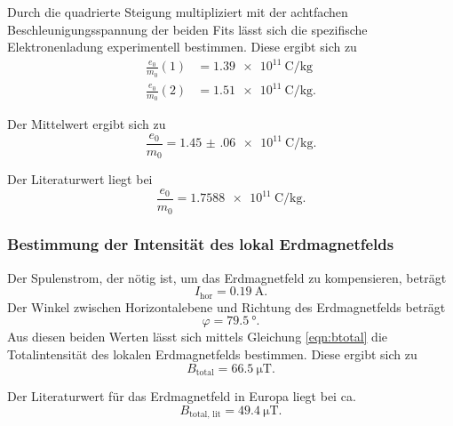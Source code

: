 \noindent Durch die quadrierte Steigung multipliziert mit der achtfachen Beschleunigungsspannung der beiden Fits
lässt sich die spezifische Elektronenladung experimentell bestimmen.
Diese ergibt sich zu
\begin{align*}
    \frac{e_0}{m_0}(1) &= \SI{1.39e11}{\coulomb\per\kilogram}\\
    \frac{e_0}{m_0}(2) &= \SI{1.51e11}{\coulomb\per\kilogram}.
\end{align*}

\noindent Der Mittelwert ergibt sich zu 
\begin{equation*}
    \frac{e_0}{m_0} = \SI{1.45(06)e11}{\coulomb\per\kilo\gram}.
\end{equation*}

\noindent Der Literaturwert liegt bei 
\begin{equation*}
    \frac{e_0}{m_0} = \SI{1.7588e11}{\coulomb\per\kilo\gram}.
\end{equation*}

\subsubsection{Bestimmung der Intensität des lokal Erdmagnetfelds}
Der Spulenstrom, der nötig ist, um das Erdmagnetfeld zu
kompensieren, beträgt
\begin{equation*}
    I_\text{hor} = \SI{0.19}{\ampere}.
\end{equation*}
Der Winkel zwischen Horizontalebene und Richtung des Erdmagnetfelds
beträgt
\begin{equation*}
    \varphi = \SI{79.5}{\degree}.
\end{equation*}
Aus diesen beiden Werten lässt sich mittels Gleichung \eqref{eqn:btotal}
die Totalintensität des lokalen Erdmagnetfelds bestimmen.
Diese ergibt sich zu
\begin{equation*}
    B_\text{total} = \SI{66.5}{\micro\tesla}.
\end{equation*}

\noindent Der Literaturwert für das Erdmagnetfeld in Europa \cite{btotal} liegt bei ca.
\begin{equation*}
    B_\text{total, lit} = \SI{49.4}{\micro\tesla}.
\end{equation*} %

